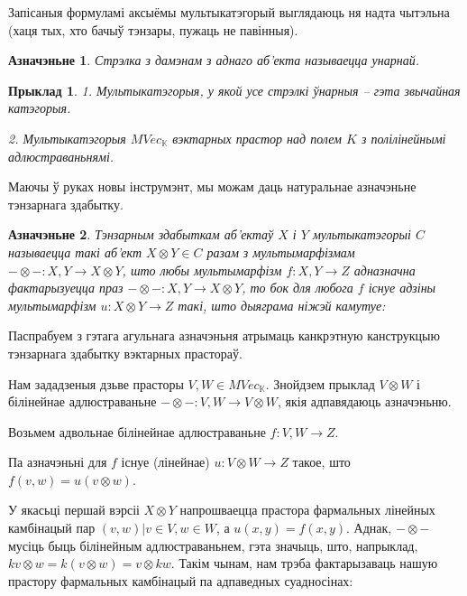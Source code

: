 \documentclass[a4paper,12pt]{book}
\newtheorem{example}{Прыклад}[section]
\newtheorem{definition}{Азначэньне}[section]
\begin{document}
Запісаныя формуламі аксыёмы мультыкатэгорый выглядаюць ня надта
чытэльна (хаця тых, хто бачыў тэнзары, пужаць не павінныя).

\begin{definition}
  Стрэлка з дамэнам з аднаго аб'екта называецца унарнай.
\end{definition}

\begin{example}
  1. Мультыкатэгорыя, у якой усе стрэлкі ўнарныя -- гэта звычайная
  катэгорыя.

  2. Мультыкатэгорыя $MVec_{\mathbb{K}}$ вэктарных прастор над полем
  $K$ з полілінейнымі адлюстраваньнямі.
\end{example}

Маючы ў руках новы інструмэнт, мы можам даць натуральнае азначэньне
тэнзарнага здабытку.

\begin{definition}
  Тэнзарным здабыткам аб'ектаў $X$ і $Y$ мультыкатэгорыі $C$
  называецца такі аб'ект $X \otimes Y \in C$ разам з мультымарфізмам
  $- \otimes -: X, Y \rightarrow X \otimes Y$, што любы мультымарфізм
  $f: X, Y \rightarrow Z$ адназначна фактарызуецца праз $- \otimes -:
  X, Y \rightarrow X \otimes Y$, то бок для любога $f$ існуе адзіны
  мультымарфізм $u: X \otimes Y \rightarrow Z$ такі, што дыяграма
  ніжэй камутуе:

\end{definition}

Паспрабуем з гэтага агульнага азначэньня атрымаць канкрэтную
канструкцыю тэнзарнага здабытку вэктарных прастораў.

Нам зададзеныя дзьве прасторы $V, W \in MVec_{\mathbb{K}}$.
Знойдзем прыклад $V \otimes W$ і білінейнае адлюстраваньне $-\otimes-: V, W
\rightarrow V \otimes W$, якія адпавядаюць азначэньню.

Возьмем адвольнае білінейнае адлюстраваньне $f: V, W \rightarrow
Z$.

Па азначэньні для $f$ існуе (лінейнае) $u: V \otimes W \rightarrow Z$ такое, што
$f(v, w) = u(v \otimes w)$.

У якасьці першай вэрсіі $X \otimes Y$ напрошваецца прастора фармальных
лінейных камбінацый пар $(v, w) | v \in V, w \in W$, а $u(x, y) = f(x,
y)$.
Аднак, $- \otimes -$ мусіць быць білінейным адлюстраваньнем, гэта
значыць, што, напрыклад, $kv \otimes w = k(v \otimes w) = v \otimes
kw$. Такім чынам, нам трэба фактарызаваць нашую прастору фармальных
камбінацый па адпаведных суадносінах:
\end{document}
